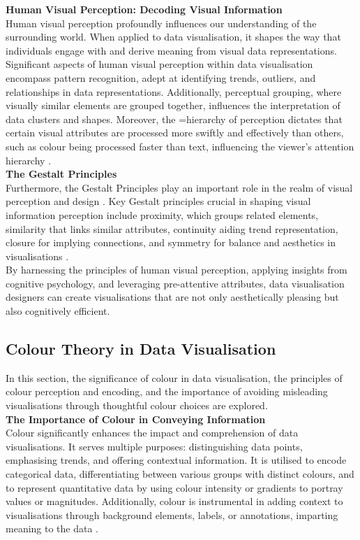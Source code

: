 \documentclass{article}\usepackage[]{graphicx}\usepackage[]{xcolor}
\numberwithin{equation}{section}
\begin{document}
\noindent \textbf{Human Visual Perception: Decoding Visual Information}\\
Human visual perception profoundly influences our understanding of the surrounding world. When applied to data visualisation, it shapes the way that individuals engage with and derive meaning from visual data representations.\\

\noindent 
Significant aspects of human visual perception within data visualisation encompass pattern recognition, adept at identifying trends, outliers, and relationships in data representations. Additionally, perceptual grouping, where visually similar elements are grouped together, influences the interpretation of data clusters and shapes. Moreover, the =hierarchy of perception dictates that certain visual attributes are processed more swiftly and effectively than others, such as colour being processed faster than text, influencing the viewer's attention hierarchy \cite{dastani2002role}.\\

\noindent \textbf{The Gestalt Principles }\\
Furthermore, the Gestalt Principles play an important role in the realm of visual perception and design \cite{rosli2015gestalt}. Key Gestalt principles crucial in shaping visual information perception include proximity, which groups related elements, similarity that links similar attributes, continuity aiding trend representation, closure for implying connections, and symmetry for balance and aesthetics in visualisations \cite{todorovic2008gestalt}. \\

\noindent By harnessing the principles of human visual perception, applying insights from cognitive psychology, and leveraging pre-attentive attributes, data visualisation designers can create visualisations that are not only aesthetically pleasing but also cognitively efficient.	


\subsection{Colour Theory in Data Visualisation}
In this section, the significance of colour in data visualisation, the principles of colour perception and encoding, and the importance of avoiding misleading visualisations through thoughtful colour choices are explored.\\

\noindent \textbf{The Importance of Colour in Conveying Information}\\
Colour significantly enhances the impact and comprehension of data visualisations. It serves multiple purposes: distinguishing data points, emphasising trends, and offering contextual information. It is utilised to encode categorical data, differentiating between various groups with distinct colours, and to represent quantitative data by using colour intensity or gradients to portray values or magnitudes. Additionally, colour is instrumental in adding context to visualisations through background elements, labels, or annotations, imparting meaning to the data \cite{healy2018data}.\\
\end{document}

